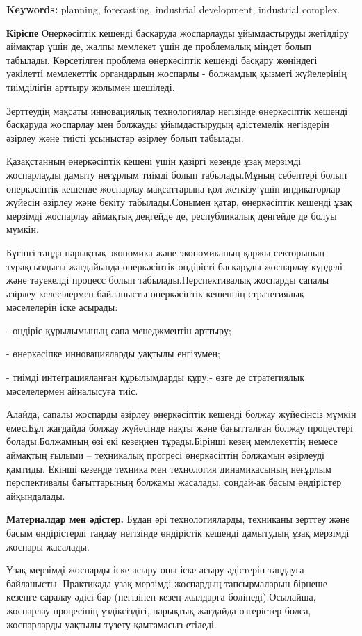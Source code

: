 {\bfseries Keywords:} planning, forecasting, industrial development,
industrial complex.
\begin{multicols}{2}

{\bfseries Кіріспе} Өнеркәсіптік кешенді басқаруда жоспарлауды
ұйымдастыруды жетілдіру аймақтар үшін де, жалпы мемлекет үшін де
проблемалық міндет болып табылады. Көрсетілген проблема өнеркәсіптік
кешенді басқару жөніндегі уәкілетті мемлекеттік органдардың жоспарлы -
болжамдық қызметі жүйелерінің тиімділігін арттыру жолымен шешіледі.

Зерттеудің мақсаты инновациялық технологиялар негізінде өнеркәсіптік
кешенді басқаруда жоспарлау мен болжауды ұйымдастырудың әдістемелік
негіздерін әзірлеу және тиісті ұсыныстар әзірлеу болып табылады.

Қазақстанның өнеркәсіптік кешені үшін қазіргі кезеңде ұзақ мерзімді
жоспарлауды дамыту неғұрлым тиімді болып табылады.Мұның себептері болып
өнеркәсіптік кешенде жоспарлау мақсаттарына қол жеткізу үшін
индикаторлар жүйесін әзірлеу және бекіту табылады.Сонымен қатар,
өнеркәсіптік кешенді ұзақ мерзімді жоспарлау аймақтық деңгейде де,
республикалық деңгейде де болуы мүмкін.

Бүгінгі таңда нарықтық экономика және экономиканың қаржы секторының
тұрақсыздығы жағдайында өнеркәсіптік өндірісті басқаруды жоспарлау
күрделі және тәуекелді процесс болып табылады.Перспективалық жоспарды
сапалы әзірлеу келесілермен байланысты өнеркәсіптік кешеннің
стратегиялық мәселелерін іске асырады:

- өндіріс құрылымының сапа менеджментін арттыру;

- өнеркәсіпке инновацияларды уақтылы енгізумен;

- тиімді интеграцияланған құрылымдарды құру;- өзге де стратегиялық
мәселелермен айналысуға тиіс.

Алайда, сапалы жоспарды әзірлеу өнеркәсіптік кешенді болжау жүйесінсіз
мүмкін емес.Бұл жағдайда болжау жүйесінде нақты және бағытталған болжау
процестері болады.Болжамның өзі екі кезеңнен тұрады.Бірінші кезең
мемлекеттің немесе аймақтың ғылыми -- техникалық прогресі өнеркәсіптің
болжамын әзірлеуді қамтиды. Екінші кезеңде техника мен технология
динамикасының неғұрлым перспективалы бағыттарының болжамы жасалады,
сондай-ақ басым өндірістер айқындалады.

{\bfseries Материалдар мен әдістер.} Бұдан әрі технологияларды, техниканы
зерттеу және басым өндірістерді таңдау негізінде өндірістік кешенді
дамытудың ұзақ мерзімді жоспары жасалады.

Ұзақ мерзімді жоспарды іске асыру оны іске асыру әдістерін таңдауға
байланысты. Практикада ұзақ мерзімді жоспардың тапсырмаларын бірнеше
кезеңге саралау әдісі бар (негізінен кезең жылдарға бөлінеді).Осылайша,
жоспарлау процесінің үздіксіздігі, нарықтық жағдайда өзгерістер болса,
жоспарларды уақтылы түзету қамтамасыз етіледі.

\end{multicols}

